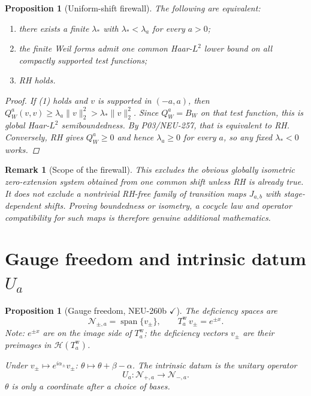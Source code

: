 \documentclass[11pt,a4paper]{amsart}
\newtheorem{proposition}[theorem]{Proposition}
\newtheorem{remark}[theorem]{Remark}
\begin{document}
\begin{proposition}[Uniform-shift firewall]\label{prop:uniform-shift}
The following are equivalent:
\begin{enumerate}
\item there exists a finite $\lambda_*$ with $\lambda_*<\lambda_a$ for every $a>0$;
\item the finite Weil forms admit one common Haar-$L^2$ lower bound on all compactly supported test functions;
\item RH holds.
\end{enumerate}
\begin{proof}
If (1) holds and $v$ is supported in $(-a,a)$, then
$Q_W^a(v,v)\ge\lambda_a\|v\|_2^2>\lambda_*\|v\|_2^2$.
Since $Q_W^a=B_W$ on that test function, this is global Haar-$L^2$
semiboundedness. By P03/NEU-257, that is equivalent to RH.
Conversely, RH gives $Q_W^a\ge0$ and hence $\lambda_a\ge0$ for every $a$,
so any fixed $\lambda_*<0$ works.
\end{proof}
\end{proposition}

\begin{remark}[Scope of the firewall]
This excludes the obvious globally isometric zero-extension system obtained
from one common shift unless RH is already true. It does not exclude a
nontrivial RH-free family of transition maps $J_{a,b}$ with stage-dependent
shifts. Proving boundedness or isometry, a cocycle law and operator
compatibility for such maps is therefore genuine additional mathematics.
\end{remark}

\section{Gauge freedom and intrinsic datum $U_a$}

\begin{proposition}[Gauge freedom, NEU-260b $\checkmark$]
The deficiency spaces are
\[
  \mathcal{N}_{\pm,a} = \operatorname{span}\{v_\pm\},
  \qquad T_a^{\mathrm{w}}\, v_\pm = e^{\pm x}.
\]
\emph{Note: $e^{\pm x}$ are on the image side of $T_a^{\mathrm{w}}$;
the deficiency vectors $v_\pm$ are their preimages in $\mathcal{H}(T_a^{\mathrm{w}})$.}

Under $v_\pm\mapsto e^{i\alpha_\pm}v_\pm$: $\theta\mapsto\theta+\beta-\alpha$.
The intrinsic datum is the unitary operator
\[
  U_a:\mathcal{N}_{+,a}\longrightarrow\mathcal{N}_{-,a}.
\]
$\theta$ is only a coordinate after a choice of bases.
\end{proposition}
\end{document}
